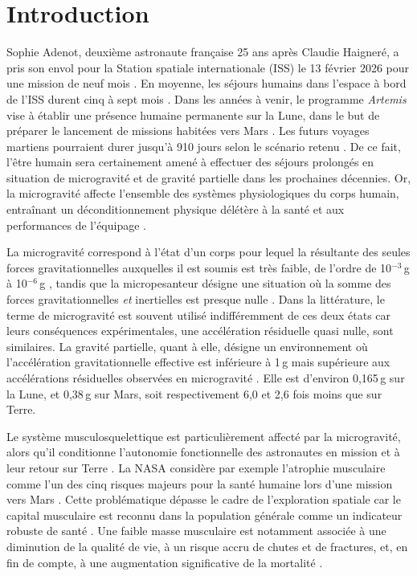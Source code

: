 \documentclass[11pt]{report}
\begin{document}
\chapter{Introduction}
\pagestyle{plain}
\setcounter{page}{1}
Sophie Adenot, deuxième astronaute française 25 ans après Claudie Haigneré, a pris son envol pour la Station spatiale internationale (ISS) le 13 février 2026 pour une mission de neuf mois \parencite{cnes_epsilon_2026}. En moyenne, les séjours humains dans l'espace à bord de l'ISS durent cinq à sept mois \parencite{NASA2024}. Dans les années à venir, le programme \textit{Artemis} vise à établir une présence humaine permanente sur la Lune, dans le but de préparer le lancement de missions habitées vers Mars \parencite{drake_human_2014}. Les futurs voyages martiens pourraient durer jusqu'à 910 jours selon le scénario retenu \parencite{NASA_ArtemisPlan2020}. De ce fait, l'être humain sera certainement amené à effectuer des séjours prolongés en situation de microgravité et de gravité partielle dans les prochaines décennies. Or, la microgravité affecte l'ensemble des systèmes physiologiques du corps humain, entraînant un déconditionnement physique délétère à la santé et aux performances de l'équipage \parencite{scott_effects_2023}.

\medskip La microgravité correspond à l'état d'un corps pour lequel la résultante des seules forces gravitationnelles auxquelles il est soumis est très faible, de l'ordre de 10$^{-3}$\,g à 10$^{-6}$\,g \parencite{Herranz2013Jan}, tandis que la micropesanteur désigne une situation où la somme des forces gravitationnelles \textit{et} inertielles est presque nulle \parencite{Rouquette2023}. Dans la littérature, le terme de microgravité est souvent utilisé indifféremment de ces deux états car leurs conséquences expérimentales, une accélération résiduelle quasi nulle, sont similaires. La gravité partielle, quant à elle, désigne un environnement où l'accélération gravitationnelle effective est inférieure à 1\,g mais supérieure aux accélérations résiduelles observées en microgravité \parencite{Richter2017Aug}. Elle est d'environ 0,165\,g sur la Lune, et 0,38\,g sur Mars, soit respectivement 6,0 et 2,6 fois moins que sur Terre.

Le système musculosquelettique est particulièrement affecté par la microgravité, alors qu'il conditionne l'autonomie fonctionnelle des astronautes en mission et à leur retour sur Terre \parencite{devirgiliis_spaceflight_2025}. La NASA considère par exemple l'atrophie musculaire comme l'un des cinq risques majeurs pour la santé humaine lors d'une mission vers Mars \parencite{Patel2020Nov}. Cette problématique dépasse le cadre de l'exploration spatiale car le capital musculaire est reconnu dans la population générale comme un indicateur robuste de santé \parencite{beaudart_health_2025}. Une faible masse musculaire est notamment associée à une diminution de la qualité de vie, à un risque accru de chutes et de fractures, et, en fin de compte, à une augmentation significative de la mortalité \parencite{beaudart_health_2025}. 
\end{document}

